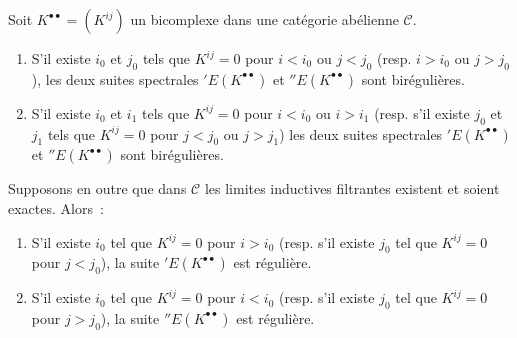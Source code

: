 \begin{proposition}[11.3.3]
\label{0.11.3.3-fr}
Soit $K^{\bullet\bullet}=(K^{ij})$ un bicomplexe dans une catégorie abélienne
$\mathcal C$.
\begin{enumerate}
  \item[(i)] S'il existe $i_0$ et $j_0$ tels que $K^{ij}=0$ pour $i<i_0$ ou
    $j<j_0$ (resp. $i>i_0$ ou $j>j_0$), les deux suites spectrales
    $'E(K^{\bullet\bullet})$ et $''E(K^{\bullet\bullet})$ sont
    birégulières.
  \item[(ii)] S'il existe $i_0$ et $i_1$ tels que $K^{ij}=0$ pour $i<i_0$ ou
    $i>i_1$ (resp. s'il existe $j_0$ et $j_1$ tels que $K^{ij}=0$ pour
    $j<j_0$ ou $j>j_1$) les deux suites spectrales
    $'E(K^{\bullet\bullet})$ et $''E(K^{\bullet\bullet})$ sont
    birégulières.
\end{enumerate}
Supposons en outre que dans $\mathcal C$ les limites inductives filtrantes
existent et soient exactes. Alors~:
\begin{enumerate}
  \item[(iii)] S'il existe $i_0$ tel que $K^{ij}=0$ pour $i>i_0$ (resp. s'il
    existe $j_0$ tel que $K^{ij}=0$ pour $j<j_0$), la suite
    $'E(K^{\bullet\bullet})$ est régulière.
  \item[(iv)] S'il existe $i_0$ tel que $K^{ij}=0$ pour $i<i_0$ (resp. s'il
    existe $j_0$ tel que $K^{ij}=0$ pour $j>j_0$), la suite
    $''E(K^{\bullet\bullet})$ est régulière.
\end{enumerate}
\end{proposition}

